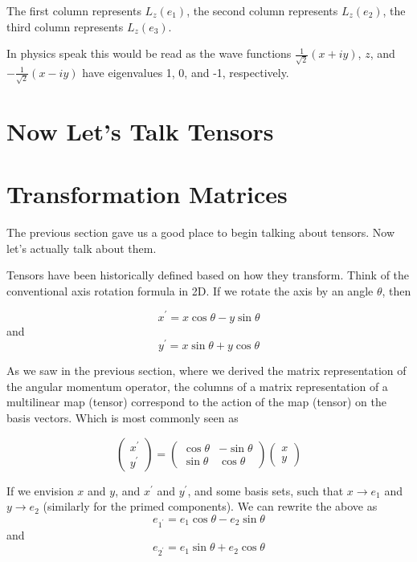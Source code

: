 The first column represents $L_z(e_1)$,
the second column represents $L_z(e_2)$,
the third column represents $L_z(e_3)$.

In physics speak this would be read as the wave functions
$\frac{1}{\sqrt{2}} (x +iy)$, $z$, and $- \frac{1}{\sqrt{2}} (x -iy)$
have eigenvalues 1, 0, and -1, respectively.




\section{Now Let's Talk Tensors}

\section{Transformation Matrices}

The previous section gave us a good place to begin talking about tensors.
Now let's actually talk about them.

Tensors have been historically defined based on how they transform.
Think of the conventional axis rotation formula in 2D.
If we rotate the axis by an angle $\theta$, then

$$
x^\prime = x \cos\theta - y \sin\theta
$$
and
$$
y^\prime = x \sin\theta + y \cos\theta
$$

As we saw in the previous section,
where we derived the matrix representation of the angular momentum operator,
the columns of a matrix representation of a multilinear map (tensor) correspond to the action of
the map (tensor) on the basis vectors.
Which is most commonly seen as

$$
\begin{pmatrix}
x^\prime \\
y^\prime
\end{pmatrix}
=
\begin{pmatrix}
\cos\theta & - \sin\theta \\
\sin\theta & \cos\theta
\end{pmatrix}
\begin{pmatrix}
x \\
y
\end{pmatrix}
$$

If we envision $x$ and $y$, and $x^\prime$ and $y^\prime$, and some basis sets,
such that $x \rightarrow e_1$ and $y \rightarrow e_2$ (similarly for the primed components).
We can rewrite the above as
$$
e_{1^\prime} = e_1 \cos\theta - e_2 \sin\theta
$$
and
$$
e_{2^\prime} = e_1 \sin\theta + e_2 \cos\theta
$$

